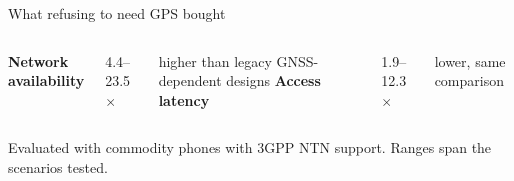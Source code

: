 \begin{frame}{What refusing to need GPS bought}
  \begin{columns}[T,onlytextwidth]
      \large\textbf{Network availability}

      \vspace{0.4em}
      {\Huge\textcolor{ranblue}{4.4--23.5\(\times\)}}

      \vspace{0.3em}
      \small higher than legacy GNSS-dependent designs
      \large\textbf{Access latency}

      \vspace{0.4em}
      {\Huge\textcolor{coreorange}{1.9--12.3\(\times\)}}

      \vspace{0.3em}
      \small lower, same comparison
  \end{columns}

  \vspace{0.5em}
  {\scriptsize\textcolor{softgray}{Evaluated with commodity phones with 3GPP
   NTN support. Ranges span the scenarios tested.}\par}


  \vspace{0.3em}
\end{frame}


